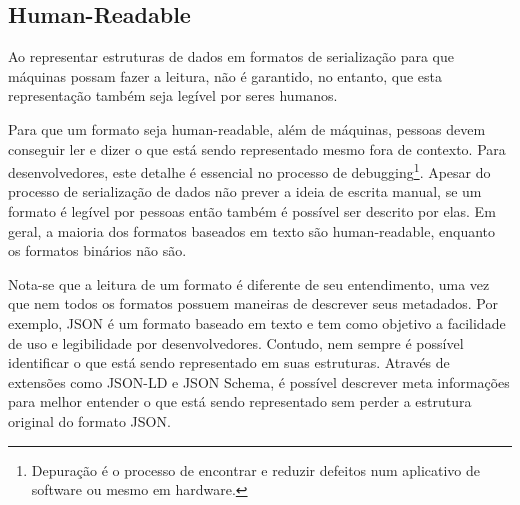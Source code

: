 \subsection[Human-Readable]{Human-Readable}

Ao representar estruturas de dados em formatos de serialização para que máquinas possam fazer a leitura, não é garantido, no entanto, que esta representação também seja legível por seres humanos.

Para que um formato seja human-readable, além de máquinas, pessoas devem conseguir ler e dizer o que está sendo representado mesmo fora de contexto. Para desenvolvedores, este detalhe é essencial no processo de debugging\footnote{
  Depuração é o processo de encontrar e reduzir defeitos num aplicativo de software ou mesmo em hardware.
}. Apesar do processo de serialização de dados não prever a ideia de escrita manual, se um formato é legível por pessoas então também é possível ser descrito por elas. Em geral, a maioria dos formatos baseados em texto são human-readable, enquanto os formatos binários não são. \cite{SumarayMakki2012}

Nota-se que a leitura de um formato é diferente de seu entendimento, uma vez que nem todos os formatos possuem maneiras de descrever seus metadados. Por exemplo, JSON é um formato baseado em texto e tem como objetivo a facilidade de uso e legibilidade por desenvolvedores. Contudo, nem sempre é possível identificar o que está sendo representado em suas estruturas. Através de extensões como JSON-LD e JSON Schema, é possível descrever meta informações para melhor entender o que está sendo representado sem perder a estrutura original do formato JSON.
